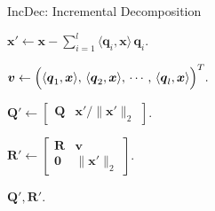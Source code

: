 
\begin{algorithm}[t]
    \caption{IncDec: Incremental Decomposition}
    \label{alg:ID}
    \DontPrintSemicolon
    
    \(
    \boldsymbol{x}' \leftarrow \boldsymbol{x} - \sum_{i=1}^l \langle \boldsymbol{q}_i,\boldsymbol{x} \rangle\, \boldsymbol{q}_i.
    \)
    
    
    
    \(
    \boldsymbol{v} \leftarrow \Bigl(\langle \boldsymbol{q}_1,\boldsymbol{x} \rangle,\, \langle \boldsymbol{q}_2,\boldsymbol{x} \rangle,\, \cdots,\, \langle \boldsymbol{q}_l,\boldsymbol{x} \rangle\Bigr)^T.
    \)
    
    
    \(
    \boldsymbol{Q}' \leftarrow \begin{bmatrix}
        \boldsymbol{Q} & \boldsymbol{x}'/\|\boldsymbol{x}'\|_2
    \end{bmatrix}.
    \)
    

    \(
    \boldsymbol{R}' \leftarrow \begin{bmatrix}
        \boldsymbol{R} & \boldsymbol{v} \\
        \boldsymbol{0} & \|\boldsymbol{x}'\|_2
    \end{bmatrix}.
    \)
    
    \Return \(\boldsymbol{Q}', \boldsymbol{R}'\).
\end{algorithm}